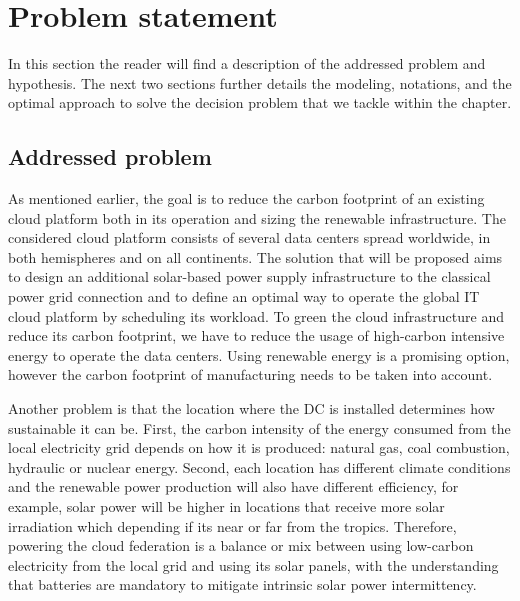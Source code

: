 \section{Problem statement}
\label{sec:problemStatement_ccgrid}

In this section the reader will find a description of the addressed problem and hypothesis. The next two sections further details the modeling, notations, and the optimal approach to solve the decision problem that we tackle within the chapter. 

\subsection{Addressed problem}
\label{sec:addressedproblem_ccgrid}

As mentioned earlier, the goal is to reduce the carbon footprint of an existing cloud platform both in its operation and sizing the renewable infrastructure. The considered cloud platform consists of several data centers spread worldwide, in both hemispheres and on all continents. The solution that will be proposed aims to design an additional solar-based power supply infrastructure to the classical power grid connection and to define an optimal way to operate the global IT cloud platform by scheduling its workload. To green the cloud infrastructure and reduce its carbon footprint, we have to reduce the usage of high-carbon intensive energy to operate the data centers. Using renewable energy is a promising option, however the carbon footprint of manufacturing needs to be taken into account.

Another problem is that the location where the DC is installed determines how sustainable it can be. First, the carbon intensity of the energy consumed from the local electricity grid depends on how it is produced: natural gas, coal combustion, hydraulic or nuclear energy. Second, each location has different climate conditions and the renewable power production will also have different efficiency, for example, solar power will be higher in locations that receive more solar irradiation which depending if its near or far from the tropics.  Therefore, powering the cloud federation is a balance or mix between using low-carbon electricity from the local grid and using its solar panels, with the understanding that batteries are mandatory to mitigate intrinsic solar power intermittency. 

